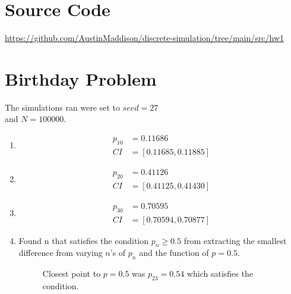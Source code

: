 \documentclass[twocolumn]{article}
\newcommand{\authorname}{Austin J. Maddison}
\begin{document}


\title{}
\author{\small \authorname \\ \small Mahidol University International College}
\date{\small \today}


%
\twocolumn[{
  \maketitle
}]

\section*{Source Code}
\href{https://github.com/AustinMaddison/discrete-simulation/tree/main/src/hw1}{https://github.com/AustinMaddison/discrete-simulation/tree/main/src/hw1}



\section{Birthday Problem}\label{p1}

The simulations ran were set to $seed=27$ \\and $N=100000$.

\begin{enumerate}[label=\alph*)]
    
\item \begin{align*}
p_{10} &= 0.11686 \\
CI &= [0.11685, 0.11885]
\end{align*}
    
\item \begin{align*}
p_{20} &=  0.41126 \\
CI &= [0.41125, 0.41430]
\end{align*}

\item \begin{align*}
p_{30} &= 0.70595 \\
CI &= [0.70594, 0.70877]
\end{align*}


\item 
Found n that satisfies the condition $p_n \ge 0.5$  from extracting the smallest difference from varying $n$'s of $p_n$ and the function of $p=0.5$.

	
\begin{figure}[H]
    \centering
    \caption{Closest point to $p=0.5$ was $p_{23}=0.54$ which satisfies the condition.}
\end{figure}

\end{enumerate}
\end{document}

